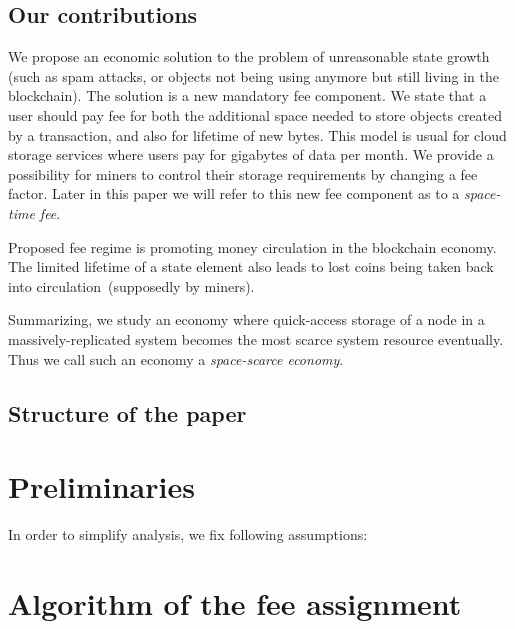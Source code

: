 \documentclass[]{llncs}   %
\newcommand{\authnote}[2]{\marginpar{\parbox{\marginparwidth}{\tiny %
  \textsf{#1 {\textcolor{blue}{notes: #2}}}}}%
  \textcolor{blue}{\textbf{\dag}}}
\newcommand{\authnote}[2]{
  \textsf{#1\textcolor{blue}{ #2}}}
\newcommand{\authnote}[2]{}
\newcommand{\knote}[1]{{\authnote{\textcolor{green}{Alex notes:}}{#1}}}
\begin{document}
\subsection{Our contributions}

We propose an economic solution to the problem of unreasonable state growth
(such as spam attacks, or objects not being using anymore but still living in
the blockchain). The solution is a new mandatory fee component. We state that a
user should pay fee for both the additional space needed to store objects
created by a transaction, and also for lifetime of new bytes. This model is
usual for cloud storage services where users pay for gigabytes of data per
month. We provide a possibility for miners to control their storage requirements
by changing a fee factor. Later in this paper we will refer to this new fee
component as to a {\em space-time fee}.

\knote{write abt fee adjustment rule}

Proposed fee regime is promoting money circulation in the blockchain economy.
The limited lifetime of a state element also leads to lost coins being taken
back into circulation~(supposedly by miners). 

Summarizing, we study an economy where quick-access storage of a node in a
massively-replicated system becomes the most scarce system resource eventually.
Thus we call such an economy a {\em space-scarce economy}.

\subsection{Structure of the paper}

\knote{todo: write}

\section{Preliminaries}

In order to simplify analysis, we fix following assumptions: 



\section{Algorithm of the fee assignment}
\end{document}
